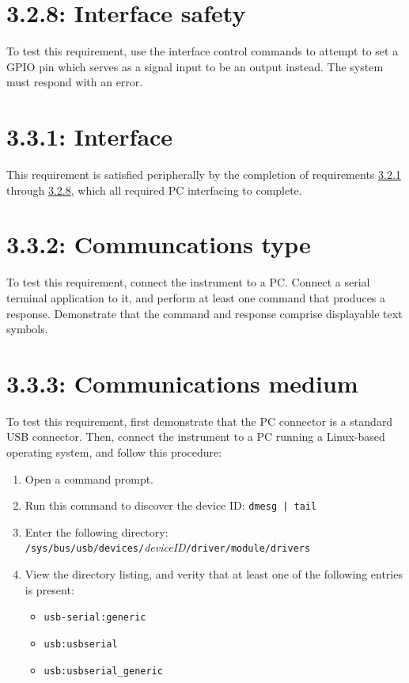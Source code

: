 \section*{3.2.8: Interface safety}
\label{tp:3.2.8}
To test this requirement, use the interface control commands to attempt to set a GPIO pin
which serves as a signal input to be an output instead. The system must respond with an error.

\section*{3.3.1: Interface}
This requirement is satisfied peripherally by the completion of requirements \hyperref[tp:3.2.1]{3.2.1}
through \hyperref[tp:3.2.8]{3.2.8}, which all required PC interfacing to complete.

\section*{3.3.2: Communcations type}
To test this requirement, connect the instrument to a PC. Connect a serial terminal application
to it, and perform at least one command that produces a response. Demonstrate that the
command and response comprise displayable text symbols.

\section*{3.3.3: Communications medium}
To test this requirement, first demonstrate that the PC connector is a standard
USB connector. Then, connect the instrument to a PC running a Linux-based
operating system, and follow this procedure:

\begin{enumerate}
\item{Open a command prompt.}
\item{Run this command to discover the device ID: \texttt{dmesg | tail}}
\item{Enter the following directory: \texttt{/sys/bus/usb/devices/}\emph{deviceID}\texttt{/driver/module/drivers}}
\item{View the directory listing, and verity that at least one of the following entries is present:
    \begin{itemize}
    \item{\texttt{usb-serial:generic}}
    \item{\texttt{usb:usbserial}}
    \item{\texttt{usb:usbserial\_generic}}
    \end{itemize}
}
\end{enumerate}

